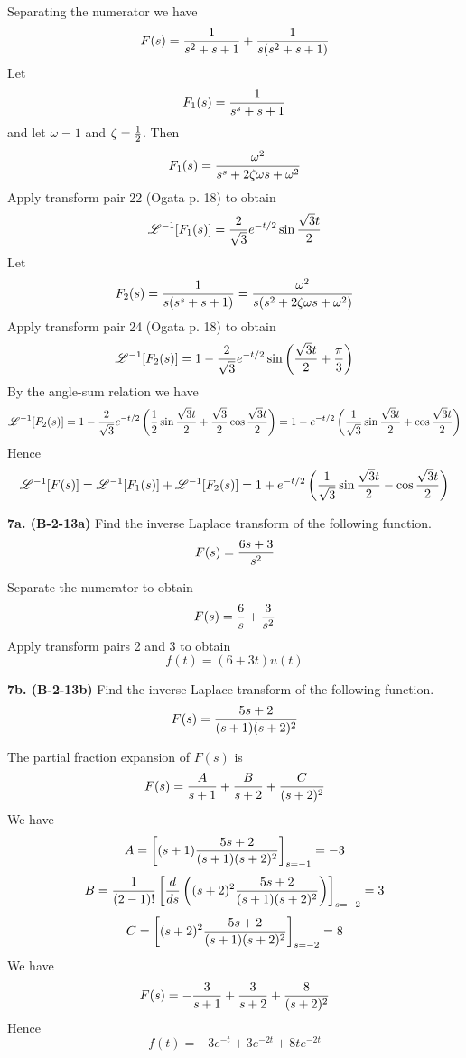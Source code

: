 \documentclass[11pt]{report}
\begin{document}
\bigskip
\noindent
Separating the numerator we have
$$F(s)={1\over s^2+s+1}+{1\over s(s^2+s+1)}$$
Let
$$F_1(s)={1\over s^s+s+1}$$
and let $\omega=1$ and $\zeta={1\over2}$.
Then
$$F_1(s)={\omega^2\over s^s+2\zeta\omega s+\omega^2}$$
Apply transform pair 22 (Ogata p. 18) to obtain
$${\mathscr L}^{-1}[F_1(s)]={2\over\sqrt3}e^{-t/2}\sin{\sqrt3t\over 2}$$
Let
$$F_2(s)={1\over s(s^s+s+1)}={\omega^2\over s(s^2+2\zeta\omega s+\omega^2)}$$
Apply transform pair 24 (Ogata p. 18) to obtain
$${\mathscr L}^{-1}[F_2(s)]=1-{2\over\sqrt3}e^{-t/2}\sin
\left({\sqrt3t\over2}+{\pi\over3}\right)$$
By the angle-sum relation we have
$${\mathscr L}^{-1}[F_2(s)]=1-{2\over\sqrt3}e^{-t/2}
\left({1\over2}\sin{\sqrt3t\over2}+{\sqrt3\over2}\cos{\sqrt3t\over2}\right)
=1-e^{-t/2}\left({1\over\sqrt3}\sin{\sqrt3t\over2}+\cos{\sqrt3t\over2}\right)
$$
Hence
$${\mathscr L}^{-1}[F(s)]={\mathscr L}^{-1}[F_1(s)]+{\mathscr L}^{-1}[F_2(s)]=
1+e^{-t/2}\left(
{1\over\sqrt3}\sin{\sqrt3t\over2}-\cos{\sqrt3t\over2}\right)$$

\newpage

\noindent
{\bf 7a. (B-2-13a)} Find the inverse Laplace transform of the following
function.
$$F(s)={6s+3\over s^2}$$

\bigskip
\noindent
Separate the numerator to obtain
$$F(s)={6\over s}+{3\over s^2}$$
Apply transform pairs 2 and 3 to obtain
$$f(t)=(6+3t)u(t)$$

\bigskip
\noindent
{\bf 7b. (B-2-13b)} Find the inverse Laplace transform of the following
function.
$$F(s)={5s+2\over(s+1)(s+2)^2}$$

\bigskip
\noindent
The partial fraction expansion of $F(s)$ is
$$F(s)={A\over s+1}+{B\over s+2}+{C\over(s+2)^2}$$
We have
$$A=\left[(s+1){5s+2\over(s+1)(s+2)^2}\right]_{s=-1}=-3$$
$$B={1\over(2-1)!}\left[{d\over ds}
\left((s+2)^2{5s+2\over(s+1)(s+2)^2}\right)\right]_{s=-2}=3$$
$$C=\left[(s+2)^2{5s+2\over(s+1)(s+2)^2}\right]_{s=-2}=8$$
We have
$$F(s)=-{3\over s+1}+{3\over s+2}+{8\over(s+2)^2}$$
Hence
$$f(t)=-3e^{-t}+3e^{-2t}+8te^{-2t}$$
\end{document}
